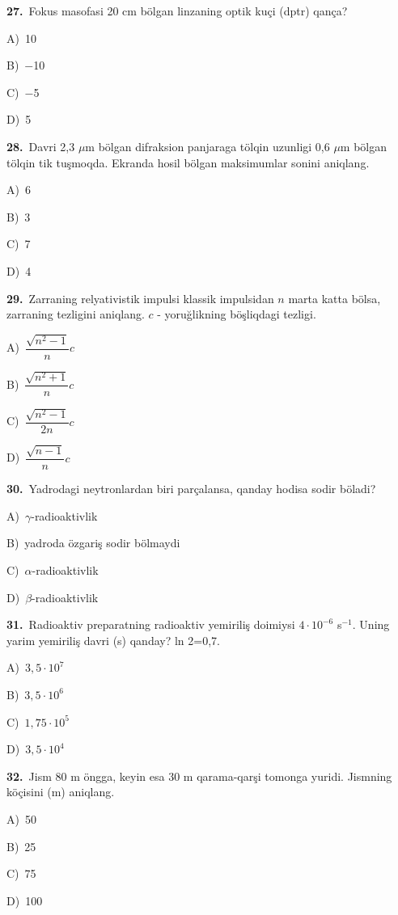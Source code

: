 \documentclass[11pt,a4paper]{article}
\newcommand{\opt}[2]{\hspace*{4mm}#1)\ #2\par}
\begin{document}
\noindent\begin{minipage}{\linewidth}
\textbf{27.}\ Fokus masofasi 20 cm bölgan linzaning optik kuçi (dptr) qança?\par\smallskip
\opt{A}{10}
\opt{B}{$-$10}
\opt{C}{$-$5}
\opt{D}{5}
\end{minipage}\vspace{9pt}\par
\noindent\begin{minipage}{\linewidth}
\textbf{28.}\ Davri 2,3 $\mu$m bölgan difraksion panjaraga tölqin uzunligi 0,6 $\mu$m bölgan tölqin tik tuşmoqda. Ekranda hosil bölgan maksimumlar sonini aniqlang.\par\smallskip
\opt{A}{6}
\opt{B}{3}
\opt{C}{7}
\opt{D}{4}
\end{minipage}\vspace{9pt}\par
\noindent\begin{minipage}{\linewidth}
\textbf{29.}\ Zarraning relyativistik impulsi klassik impulsidan $n$ marta katta bölsa, zarraning tezligini aniqlang. $c$ - yoruğlikning böşliqdagi tezligi.\par\smallskip
\opt{A}{$\dfrac{\sqrt{n^2-1}}{n}c$}
\opt{B}{$\dfrac{\sqrt{n^2+1}}{n}c$}
\opt{C}{$\dfrac{\sqrt{n^2-1}}{2n}c$}
\opt{D}{$\dfrac{\sqrt{n-1}}{n}c$}
\end{minipage}\vspace{9pt}\par
\noindent\begin{minipage}{\linewidth}
\textbf{30.}\ Yadrodagi neytronlardan biri parçalansa, qanday hodisa sodir böladi?\par\smallskip
\opt{A}{$\gamma$-radioaktivlik}
\opt{B}{yadroda özgariş sodir bölmaydi}
\opt{C}{$\alpha$-radioaktivlik}
\opt{D}{$\beta$-radioaktivlik}
\end{minipage}\vspace{9pt}\par
\noindent\begin{minipage}{\linewidth}
\textbf{31.}\ Radioaktiv preparatning radioaktiv yemiriliş doimiysi $4\cdot10^{-6}$ s$^{-1}$. Uning yarim yemiriliş davri (s) qanday? ln 2=0,7.\par\smallskip
\opt{A}{$3{,}5\cdot10^7$}
\opt{B}{$3{,}5\cdot10^6$}
\opt{C}{$1{,}75\cdot10^5$}
\opt{D}{$3{,}5\cdot10^4$}
\end{minipage}\vspace{9pt}\par
\noindent\begin{minipage}{\linewidth}
\textbf{32.}\ Jism 80 m öngga, keyin esa 30 m qarama-qarşi tomonga yuridi. Jismning köçisini (m) aniqlang.\par\smallskip
\opt{A}{50}
\opt{B}{25}
\opt{C}{75}
\opt{D}{100}
\end{minipage}\vspace{9pt}\par
\end{document}
